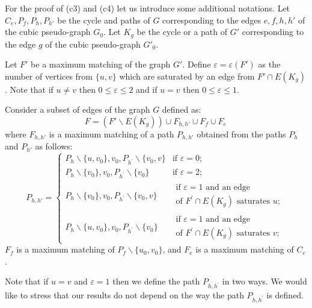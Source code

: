 \documentclass[fleqn,12pt,twoside]{article}
\newenvironment{proof}[1][Proof.]{\begin{trivlist}
\item[\hskip \labelsep {\bfseries #1}]}{\end{trivlist}}
\begin{document}
\begin{proof}
For the proof of (c3) and (c4) let us introduce some additional
notations. Let $C_{e},P_{f},P_{h},P_{h'}$ be the cycle and paths of
$G$
corresponding to the edges $e,f,h,h'$ of the cubic pseudo-graph $G_{0}$. Let $K_{g}$ be the cycle or a path of $G'$ corresponding to
the edge $g$ of the cubic pseudo-graph $G'_{0}$.

Let $F'$ be a maximum matching of the graph $G'$. Define
$\varepsilon =\varepsilon (F')$ as the number of vertices from
$\{u,v\}$ which
are saturated by an edge from $F'\cap E(K_{g})$. Note that if $u\neq v$ then $0\leq \varepsilon \leq 2$ and if $u=v$ then $0\leq \varepsilon \leq 1$.

Consider a subset of edges of the graph $G$ defined as:
\begin{equation*}
F=(F'\backslash E(K_{g}))\cup F_{h,h'}\cup F_{f}\cup F_{e}\,
\end{equation*}where $F_{h,h'}$ is a maximum matching of a path $P_{h,h'}$ obtained
from the paths $P_{h}$ and $P_{h'}$ as follows:
\begin{equation*}
P_{h,h'}=\left\{
\begin{array}{ll}
P_{h}\backslash \{u,v_{0}\},v_{0},P_{h^{\prime }}\backslash
\{v_{0},v\} &
\text{if }\varepsilon =0\text{;} \\
P_{h}\backslash \{v_{0}\},v_{0},P_{h^{\prime }}\backslash \{v_{0}\} & \text{if }\varepsilon =2\text{;} \\
P_{h}\backslash \{v_{0}\},v_{0},P_{h^{\prime }}\backslash
\{v_{0},v\} &
\begin{array}{l}
\text{if }\varepsilon =1\text{ and an edge } \\
\text{of }F^{\prime }\cap E(K_{g})\text{ saturates }u\text{;}\end{array}
\\
P_{h}\backslash \{u,v_{0}\},v_{0},P_{h^{\prime }}\backslash
\{v_{0}\} &
\begin{array}{l}
\text{if }\varepsilon =1\text{ and an edge } \\
\text{of }F^{\prime }\cap E(K_{g})\text{ saturates }v\text{;}\end{array}\end{array}\right.
\end{equation*}$F_{f}$ is a maximum matching of $P_{f}\backslash \{u_{0},v_{0}\}$, and $F_{e}$ is a maximum matching of $C_{e}$.

Note that if $u=v$ and $\varepsilon =1$ then we define the path
$P_{h,h^{\prime }}$ in two ways. We would like to stress that our
results do not depend on the way the path $P_{h,h^{\prime }}$ is
defined.


\end{proof}
\end{document}
